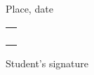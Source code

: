 {\begin{minipage}{0.3\textwidth}
    \vspace{0.1cm}

    Place, date
\end{minipage}\begin{minipage}{0.1\textwidth}
     \phantom{a}
\end{minipage}\begin{minipage}{0.6\textwidth}
    \begin{tabularx}{\textwidth}{|X|}
        \hline
        \\
        \\
        \\
        \\
        \hline
    \end{tabularx}

    \vspace{0.1cm}

    \raggedleft Student's signature
\end{minipage}
}
\newpage
% 